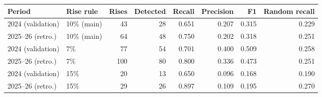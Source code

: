 \setlength{\tabcolsep}{4pt}
\begin{tabular}{llrrrrrr}
\toprule
\textbf{Period} & \textbf{Rise rule} & \textbf{Rises} & \textbf{Detected} & \textbf{Recall} & \textbf{Precision} & \textbf{F1} & \textbf{Random recall} \\
\midrule
2024 (validation) & 10\% (main) & 43 & 28 & 0.651 & 0.207 & 0.315 & 0.229 \\
2025--26 (retro.) & 10\% (main) & 64 & 48 & 0.750 & 0.202 & 0.318 & 0.251 \\
2024 (validation) & 7\% & 77 & 54 & 0.701 & 0.400 & 0.509 & 0.258 \\
2025--26 (retro.) & 7\% & 100 & 80 & 0.800 & 0.336 & 0.473 & 0.251 \\
2024 (validation) & 15\% & 20 & 13 & 0.650 & 0.096 & 0.168 & 0.190 \\
2025--26 (retro.) & 15\% & 29 & 26 & 0.897 & 0.109 & 0.195 & 0.270 \\
\bottomrule
\end{tabular}
